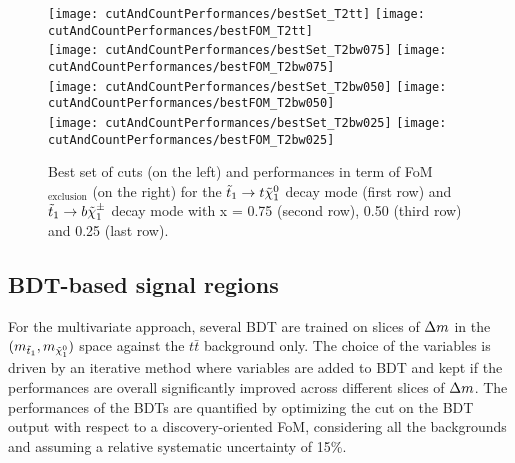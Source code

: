             \begin{figure}[h!]
                \centering
                \texttt{[image: cutAndCountPerformances/bestSet\_T2tt]}
                \texttt{[image: cutAndCountPerformances/bestFOM\_T2tt]}\\
                \texttt{[image: cutAndCountPerformances/bestSet\_T2bw075]}
                \texttt{[image: cutAndCountPerformances/bestFOM\_T2bw075]}\\
                \texttt{[image: cutAndCountPerformances/bestSet\_T2bw050]}
                \texttt{[image: cutAndCountPerformances/bestFOM\_T2bw050]}\\
                \texttt{[image: cutAndCountPerformances/bestSet\_T2bw025]}
                \texttt{[image: cutAndCountPerformances/bestFOM\_T2bw025]}
                \caption{Best set of cuts (on the left) and performances in term of
                FoM$_\text{exclusion}$ (on the right) for the $\tilde{t}_1 \rightarrow t
                \tilde{\chi}_1^0$ decay mode (first row) and $\tilde{t}_1 \rightarrow b \tilde{\chi}_1^\pm$
                decay mode with x = 0.75 (second row), 0.50 (third row) and 0.25 (last row).}
                \label{fig:cutAndCountPerformances}
            \end{figure}

        \subsection{BDT-based signal regions}

        For the multivariate approach, several BDT are trained on slices of $\Delta m$ in the $(m_{\tilde{t}_1},m_{\tilde{\chi}_1^0})$
        space against the $t\bar{t}$ background only. The choice of the variables is driven by an iterative method where variables
        are added to BDT and kept if the performances are overall significantly improved across different slices of $\Delta m$. The
        performances of the BDTs are quantified by optimizing the cut on the BDT output with respect to a discovery-oriented
        FoM, considering all the backgrounds and assuming a relative systematic uncertainty of 15\%.

